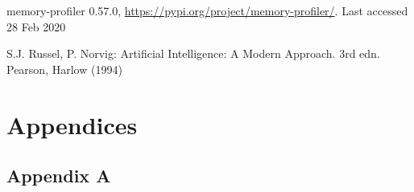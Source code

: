 \documentclass[runningheads]{llncs}
\begin{document}
%
%
%
% 
% 
%
\begin{thebibliography}{8}
memory-profiler 0.57.0, \url{https://pypi.org/project/memory-profiler/}. Last accessed 28 Feb 2020

S.J. Russel, P. Norvig: Artificial Intelligence: A Modern Approach. 3rd edn. Pearson, Harlow (1994)

\end{thebibliography}

\section{Appendices}
\subsection{Appendix A}
\end{document}
